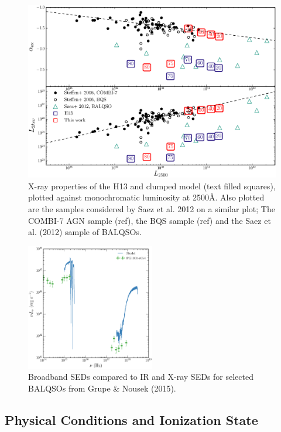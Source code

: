 \documentclass[useAMS,usenatbib]{mn2e_x}
\begin{document}
\begin{figure}
\centering
\includegraphics[width=1.0\textwidth]{figures/alpha_ox_both.eps}
\caption
{
X-ray properties of the H13 and clumped model (text filled 
squares), plotted against monochromatic luminosity 
at 2500\AA. Also plotted are the samples considered by
Saez et al. 2012 on a similar plot; The COMBI-7 AGN sample (ref),
the BQS sample (ref) and the Saez et al. (2012) sample of BALQSOs.
}
\label{fig:xray}
\end{figure}

\begin{figure}
\centering
\includegraphics[width=0.5\textwidth]{figures/xray_spectrum_lnu.eps}
\caption
{
Broadband SEDs compared to IR and X-ray SEDs for selected BALQSOs 
from Grupe \& Nousek (2015).
}
\label{fig:xray}
\end{figure}

\subsection{Physical Conditions and Ionization State}
\end{document}
